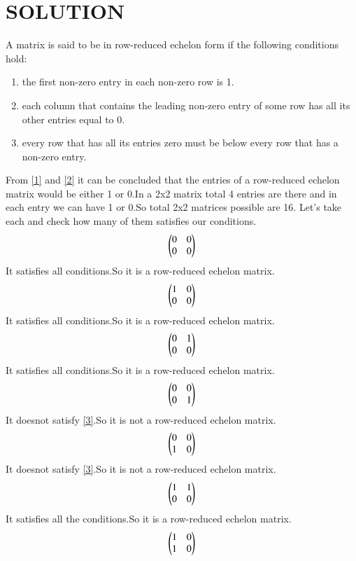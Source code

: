 \documentclass[journal,12pt,twocolumn]{IEEEtran}
\begin{document}
\section{SOLUTION}
A matrix is said to be in row-reduced echelon form if the following conditions hold:
\begin{enumerate}
    \item the first non-zero entry in each non-zero row is 1.\label{1}
    \item each column that contains the leading non-zero entry of some row has all its other entries equal to 0.\label{2}
    \item every row that has all its entries zero must be below every row that has a non-zero entry.\label{3}
\end{enumerate}
From \eqref{1} and \eqref{2} it can be concluded that the entries of a row-reduced echelon matrix would be either 1 or 0.In a 2x2 matrix total 4 entries are there and in each entry we can have 1 or 0.So total 2x2 matrices possible are 16.
Let's take each and check how many of them satisfies our conditions.
\begin{align}
 \begin{pmatrix}0&0\\0&0\end{pmatrix}
\end{align}
It satisfies all conditions.So it is a row-reduced echelon matrix.
\begin{align}
 \begin{pmatrix}1&0\\0&0\end{pmatrix}
\end{align}
It satisfies all conditions.So it is a row-reduced echelon matrix.
\begin{align}
 \begin{pmatrix}0&1\\0&0\end{pmatrix}
\end{align}
It satisfies all conditions.So it is a row-reduced echelon matrix.
\begin{align}
 \begin{pmatrix}0&0\\0&1\end{pmatrix}
\end{align}
It doesnot satisfy \eqref{3}.So it is not a row-reduced echelon matrix.
\begin{align}
 \begin{pmatrix}0&0\\1&0\end{pmatrix}
\end{align}
It doesnot satisfy \eqref{3}.So it is not a row-reduced echelon matrix.
\begin{align}
 \begin{pmatrix}1&1\\0&0\end{pmatrix}
\end{align}
It satisfies all the conditions.So it is a row-reduced echelon matrix.
\begin{align}
 \begin{pmatrix}1&0\\1&0\end{pmatrix}
\end{align}
\end{document}
